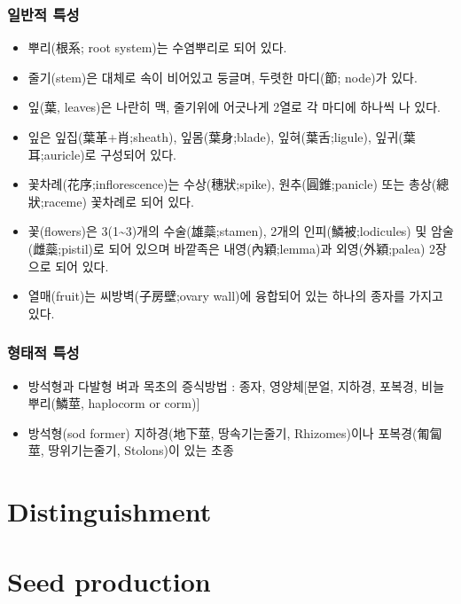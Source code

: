 \documentclass[]{book}
\providecommand{\tightlist}{%
  \setlength{\itemsep}{0pt}\setlength{\parskip}{0pt}}
\begin{document}
\subsection{일반적 특성}\label{-}

\begin{itemize}
\tightlist
\item
  뿌리(根系; root system)는 수염뿌리로 되어 있다.
\item
  줄기(stem)은 대체로 속이 비어있고 둥글며, 두렷한 마디(節; node)가
  있다.
\item
  잎(葉, leaves)은 나란히 맥, 줄기위에 어긋나게 2열로 각 마디에 하나씩
  나 있다.
\item
  잎은 잎집(葉革+肖;sheath), 잎몸(葉身;blade), 잎혀(葉舌;ligule),
  잎귀(葉耳;auricle)로 구성되어 있다.
\item
  꽃차례(花序;inflorescence)는 수상(穗狀;spike), 원추(圓錐;panicle) 또는
  총상(總狀;raceme) 꽃차례로 되어 있다.
\item
  꽃(flowers)은 3(1\textasciitilde{}3)개의 수술(雄蘂;stamen), 2개의
  인피(鱗被;lodicules) 및 암술(雌蘂;pistil)로 되어 있으며 바깥족은
  내영(內穎;lemma)과 외영(外穎;palea) 2장으로 되어 있다.
\item
  열매(fruit)는 씨방벽(子房壁;ovary wall)에 융합되어 있는 하나의 종자를
  가지고 있다.
\end{itemize}

\subsection{형태적 특성}\label{-}

\begin{itemize}
\tightlist
\item
  방석형과 다발형 벼과 목초의 증식방법 : 종자, 영양체{[}분얼, 지하경,
  포복경, 비늘뿌리(鱗莖, haplocorm or corm){]}
\item
  방석형(sod former) 지하경(地下莖, 땅속기는줄기, Rhizomes)이나
  포복경(匍匐莖, 땅위기는줄기, Stolons)이 있는 초종
\end{itemize}

\chapter{Distinguishment}\label{distinguishment}

\chapter{Seed production}\label{seed-production}


\end{document}

